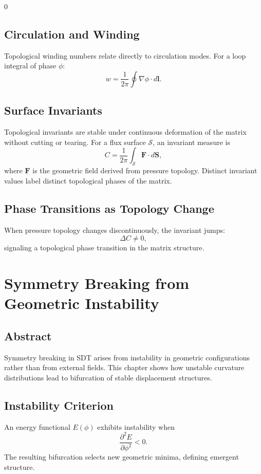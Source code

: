 0\documentclass[12pt]{book}
\begin{document}
\section{Circulation and Winding}
Topological winding numbers relate directly to circulation modes. For a loop integral of phase $\phi$:
\begin{equation}
w = \frac{1}{2\pi}\oint \nabla \phi \cdot d\mathbf{l}.
\end{equation}

\section{Surface Invariants}
Topological invariants are stable under continuous deformation of the matrix without cutting or tearing.
For a flux surface $\mathcal{S}$, an invariant measure is
\begin{equation}
C = \frac{1}{2\pi}\int_{\mathcal{S}} \mathbf{F}\cdot d\mathbf{S},
\end{equation}
where $\mathbf{F}$ is the geometric field derived from pressure topology. Distinct invariant values label
distinct topological phases of the matrix.

\section{Phase Transitions as Topology Change}
When pressure topology changes discontinuously, the invariant jumps:
\begin{equation}
\Delta C \neq 0,
\end{equation}
signaling a topological phase transition in the matrix structure.

\chapter{Symmetry Breaking from Geometric Instability}

\section*{Abstract}
Symmetry breaking in SDT arises from instability in geometric configurations rather than from
external fields. This chapter shows how unstable curvature distributions lead to bifurcation of
stable displacement structures.

\section{Instability Criterion}
An energy functional $E(\phi)$ exhibits instability when
\begin{equation}
\frac{\partial^2 E}{\partial \phi^2} < 0.
\end{equation}
The resulting bifurcation selects new geometric minima, defining emergent structure.
\end{document}
